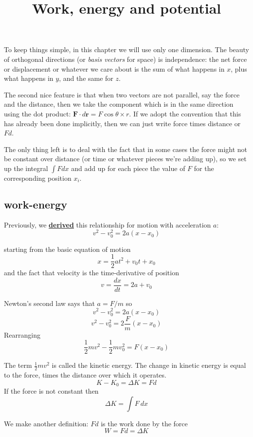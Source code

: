 \documentclass[11pt, oneside]{article}
\title{Work, energy and potential}
\date{}
\begin{document}
\maketitle
\Large

To keep things simple, in this chapter we will use only one dimension.  The beauty of orthogonal directions (or \emph{basis vectors} for space) is independence:  the net force or displacement or whatever we care about is the sum of what happens in $x$, plus what happens in $y$, and the same for $z$.

The second nice feature is that when two vectors are not parallel, say the force and the distance, then we take the component which is in the same direction using the dot product:  $\mathbf{F} \cdot d \mathbf{r} = F \cos \theta \times r$.  If we adopt the convention that this has already been done implicitly, then we can just write force times distance or $Fd$.

The only thing left is to deal with the fact that in some cases the force might not be constant over distance (or time or whatever pieces we're adding up), so we set up the integral $\int F dx$ and add up for each piece the value of $F$ for the corresponding position $x_i$.

\subsection*{work-energy}

Previously, we \label{sec:Gravity}\hyperref[sec:Falling_bodies]{\textbf{derived}} this relationship for motion with acceleration $a$:
\[ v^2 - v_0^2 = 2a (x - x_0) \]

starting from the basic equation of motion
\[ x = \frac{1}{2}at^2 + v_0t + x_0 \]
and the fact that velocity is the time-derivative of position
\[ v = \frac{dx}{dt} = 2a + v_0 \]

Newton's second law says that $a = F/m$ so
\[ v^2 - v_0^2 = 2a (x - x_0) \]
\[ v^2 - v_0^2 = 2\frac{F}{m} (x - x_0) \]
Rearranging
\[ \frac{1}{2}mv^2 -  \frac{1}{2}mv_0^2 = F (x - x_0) \]

The term $\frac{1}{2} mv^2$ is called the kinetic energy.  The change in kinetic energy is equal to the force, times the distance over which it operates.
\[ K - K_0 = \Delta K = Fd \]
If the force is not constant then
\[ \Delta K = \int F \ dx \]

We make another definition:  $Fd$ is the work done by the force
\[ W = Fd = \Delta K \]
\end{document}
